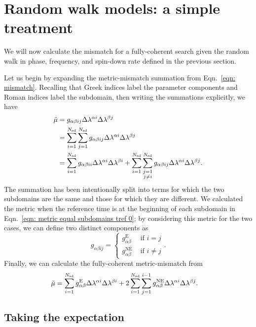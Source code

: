 \documentclass[../full_thesis/full_thesis.tex]{subfiles}
\begin{document}
\section{Random walk models: a simple treatment}
\label{sec: random walk models part I}
We will now calculate the mismatch for a fully-coherent search given the
random walk in phase, frequency, and spin-down rate defined in the previous
section.

Let us begin by expanding the metric-mismatch summation from Eqn.~\eqref{eqn:
mismatch}. Recalling that Greek indices label the parameter components and
Roman indices label the subdomain, then writing the summations explicitly, we
have
\begin{align}
\tilde{\mu} & = g_{\alpha\beta i j}\Delta\lambda^{\alpha i}\Delta\lambda^{\beta j}  \\
&=\sum_{i=1}^{N_{\textrm{sd}}}\sum_{j=1}^{N_{\textrm{sd}}}g_{\alpha\beta i j}\Delta\lambda^{\alpha i}\Delta\lambda^{\beta j}  \\
&= \sum_{i=1}^{N_{\textrm{sd}}}g_{\alpha\beta i i}\Delta\lambda^{\alpha i}\Delta\lambda^{\beta i}
+ \sum_{i=1}^{N_{\textrm{sd}}} \sum_{\substack{j=1\\ j \ne i}}^{N_{\textrm{sd}}} g_{\alpha \beta ij}\Delta\lambda^{\alpha i}\Delta\lambda^{\beta j}.
\end{align}
The summation has been intentionally split into terms for which the two
subdomains are the same and those for which they are different. We calculated
the metric when the reference time is at the beginning of each subdomain in
Eqn.~\eqref{eqn: metric equal subdomains tref 0}; by considering this metric for
the two cases, we can define two distinct components as
\begin{equation}
g_{\alpha\beta ij} = \left\{
\begin{array}{cc}
g_{\alpha\beta}^{\mathrm{E}} & \textrm{ if } i =j \\
g_{\alpha\beta}^{\mathrm{NE}} & \textrm{ if } i  \ne j
\end{array}\right.  .
\end{equation}
Finally, we can calculate the fully-coherent metric-mismatch from
\begin{align}
\tilde{\mu} &= \sum_{i=1}^{N_{\textrm{sd}}}g_{\alpha\beta}^{\mathrm{E}}\Delta\lambda^{\alpha i}\Delta\lambda^{\beta i}
+ 2\sum_{i=1}^{N_{\textrm{sd}}} \sum_{j=1}^{i-1} g_{\alpha \beta}^{\mathrm{NE}}\Delta\lambda^{\alpha i}\Delta\lambda^{\beta j} .
\label{eqn: mismatch sep}
\end{align}

\subsection{Taking the expectation}
\end{document}
